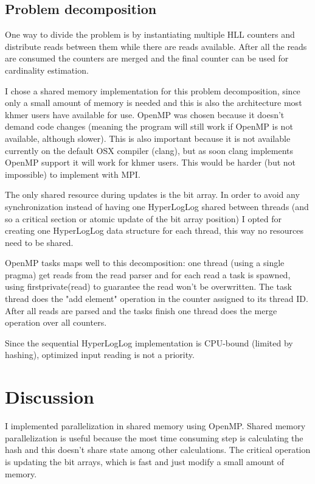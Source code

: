 \documentclass{bioinfo}
\begin{document}
\begin{methods}
\subsection{Problem decomposition}

One way to divide the problem is by instantiating multiple HLL counters
and distribute reads between them while there are reads available.
After all the reads are consumed the counters are merged and the final
counter can be used for cardinality estimation.

I chose a shared memory implementation for this problem decomposition,
since only a small amount of memory is needed and this is also the architecture
most khmer users have available for use.
OpenMP was chosen because it doesn't demand code changes
(meaning the program will still work if OpenMP is not available,
although slower).
This is also important because it is not available currently on the default OSX compiler (clang),
but as soon clang implements OpenMP support it will work for khmer users.
This would be harder (but not impossible) to implement with MPI.

The only shared resource during updates is the bit array.
In order to avoid any synchronization instead of having one HyperLogLog shared between threads
(and so a critical section or atomic update of the bit array position)
I opted for creating one HyperLogLog data structure for each thread,
this way no resources need to be shared.

OpenMP tasks maps well to this decomposition:
one thread (using a single pragma) get reads from the read parser
and for each read a task is spawned,
using firstprivate(read) to guarantee the read won't be overwritten.
The task thread does the "add element" operation in the counter assigned to its thread ID.
After all reads are parsed and the tasks finish one thread does the merge operation
over all counters.

Since the sequential HyperLogLog implementation is CPU-bound (limited by hashing),
optimized input reading is not a priority.

\end{methods}

\section{Discussion}

I implemented parallelization in shared memory using OpenMP.
Shared memory parallelization is useful because the most time consuming
step is calculating the hash and this doesn't share state among other calculations.
The critical operation is updating the bit arrays,
which is fast and just modify a small amount of memory.
\end{document}
